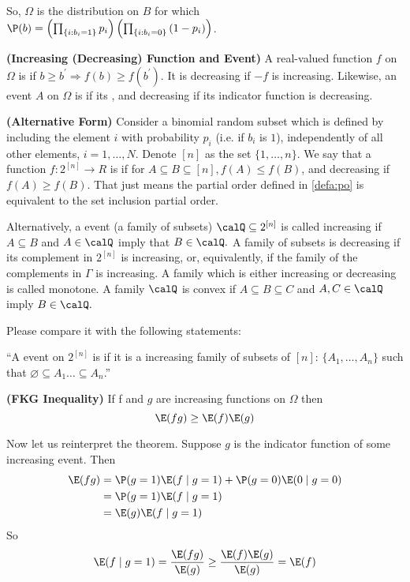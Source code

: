 \documentclass{article}
\newcommand{\bfs}[1]{\textbf{({#1})}}
\begin{document}
 So, $\Omega$ is the distribution on $B$ for which $\P(b)=\left(\prod_{\left\{i: b_{i}=1\right\}} p_{i}\right)\left(\prod_{\left\{i: b_{i}=0\right\}}\left(1-p_{i}\right)\right)$.
 
\begin{defa}{\bfs{Increasing (Decreasing) Function and Event}}
A real-valued function $f$ on $\Omega$ is  if $b \geq b^{\prime} \Rightarrow f(b) \geq f\left(b^{\prime}\right) .$ It is decreasing if $-f$ is increasing. Likewise, an event $A$ on $\Omega$ is  if its , and decreasing if its indicator function is decreasing.
\end{defa} 
\begin{rema}{\bfs{Alternative Form}}
Consider a binomial random subset which is defined by including the element $i$ with probability $p_{i}$ (i.e. if $b_i$ is $1$), independently of all other elements, $i=1, \ldots, N$. Denote $[n]$ as the set $\{1,\ldots,n\}$. We say that a function $f: 2^{[n]} \rightarrow R$ is  if for $A \subseteq B\subseteq [n], f(A) \leq f(B)$, and decreasing if $f(A) \geq f(B)$. That just means the partial order defined in \cref{defa:po} is equivalent to the set inclusion partial order.  

Alternatively, a event (a family of subsets) $\calQ \subseteq 2^{[n]}$ is called increasing if $A \subseteq B$ and $A \in \calQ$ imply that $B \in \calQ .$ A family of subsets is decreasing if its complement in $2^{[n]}$ is increasing, or, equivalently, if the family of the complements in $\Gamma$ is increasing. A family which is either increasing or decreasing is called monotone. A family $\calQ$ is convex if $A \subseteq B \subseteq C$ and $A, C \in \calQ$ imply $B \in \calQ .$

Please compare it with the following \blue{[WRONG]} statements:

``A event on $2^{[n]}$ is  if it is a increasing family of subsets of $[n]$: $\{A_1,\ldots, A_n\}$ such that $\varnothing\subseteq A_1\ldots\subseteq A_n$.''


\end{rema}
\begin{thma}{\bfs{FKG Inequality}}
If f and $g$ are increasing functions on $\Omega$ then
$$
\E(f g) \geq \E(f) \E(g)
$$
\end{thma}



\begin{rema}
Now let us reinterpret the theorem. Suppose $g$ is the indicator function of some increasing event. Then
\begin{align*}
    \E(f g)&=\P(g=1) \E(f\mid g=1)+\P(g=0) \E(0 \mid g=0)\\
    &=\P(g=1) \E(f \mid g=1)\\
    &=\E(g) \E(f \mid g=1)
\end{align*}
So
$$
\E(f \mid g=1)=\frac{\E(f g)}{\E(g)} \geq \frac{\E(f) \E(g)}{\E(g)}=\E(f)
$$
\end{rema}
\end{document}
